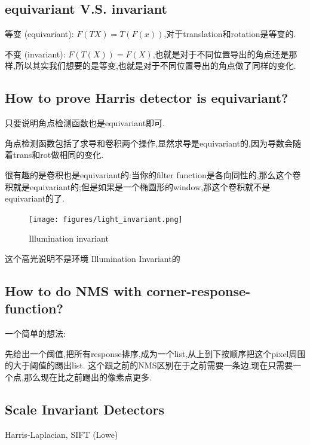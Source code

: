 \subsection{equivariant V.S. invariant}

等变 (equivariant): $F(TX)=T(F(x))$,对于translation和rotation是等变的.

不变 (invariant): $F(T(X))=F(X)$,也就是对于不同位置导出的角点还是那样,所以其实我们想要的是等变,也就是对于不同位置导出的角点做了同样的变化.

\subsection{How to prove Harris detector is equivariant?}

只要说明角点检测函数也是equivariant即可.

角点检测函数包括了求导和卷积两个操作,显然求导是equivariant的,因为导数会随着trans和rot做相同的变化.

很有趣的是卷积也是equivariant的:当你的filter function是各向同性的,那么这个卷积就是equivariant的;但是如果是一个椭圆形的window,那这个卷积就不是equivariant的了.

\begin{figure}[htbp]
    \centering
    \texttt{[image: figures/light\_invariant.png]}
    \caption{Illumination invariant}
\end{figure}

这个高光说明不是环境 Illumination Invariant的

\subsection{How to do NMS with corner-response-function?}

一个简单的想法:

先给出一个阈值,把所有response排序,成为一个list,从上到下按顺序把这个pixel周围的大于阈值的踢出list.
这个跟之前的NMS区别在于之前需要一条边,现在只需要一个点,那么现在比之前踢出的像素点更多.

\subsection{Scale Invariant Detectors}

Harris-Laplacian, SIFT (Lowe)